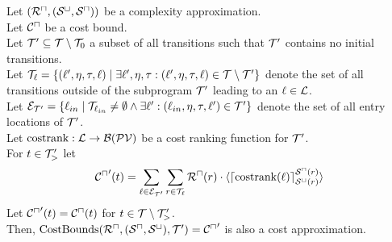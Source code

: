 \begin{theorem}[CostBounds]
  Let $({\mathcal{R}^\sqcap}, {({\mathcal{S}^\sqcup}, {\mathcal{S}^\sqcap})})$ be a complexity approximation. \\
  Let ${\mathcal{C}^\sqcap}$ be a cost bound. \\
  Let $\mathcal{T}' \subseteq \mathcal{T} \setminus \mathcal{T}_0$ a subset of all transitions such that $\mathcal{T}'$ contains no initial transitions. \\
  Let $\mathcal{T}_{\ell} = \lbrace (\ell', \eta, \tau, \ell) \mid \exists \ell', \eta, \tau: (\ell', \eta, \tau, \ell) \in \mathcal{T} \setminus \mathcal{T}' \rbrace$ denote the set of all transitions outside of the subprogram $\mathcal{T}'$ leading to an $\ell \in \mathcal{L}$. \\
  Let $\mathcal{E}_{\mathcal{T}'} = \lbrace \ell_{in} \mid \mathcal{T}_{\ell_{in}} \neq \emptyset \wedge \exists \ell': (\ell_{in}, \eta, \tau, \ell') \in \mathcal{T}' \rbrace$ denote the set of all entry locations of $\mathcal{T}'$. \\
  Let $\text{costrank}: \mathcal{L} \rightarrow \mathcal{B}(\mathcal{PV})$ be a cost ranking function for $\mathcal{T}'$. \\
  For $t \in \mathcal{T}'_>$ let
  \[ {\mathcal{C}^\sqcap}'(t) = \sum_{\ell \in \mathcal{E}_{\mathcal{T}'}} \sum_{r \in \mathcal{T}_\ell} {\mathcal{R}^\sqcap}(r) \cdot \langle\lceil \text{costrank}(\ell) \rceil^{{\mathcal{S}^\sqcap}(r)}_{{\mathcal{S}^\sqcup}(r)}\rangle \]
  Let ${\mathcal{C}^\sqcap}'(t) = {\mathcal{C}^\sqcap}(t)$ for $t \in \mathcal{T} \setminus \mathcal{T}'_>$. \\
  Then, $\text{CostBounds}({\mathcal{R}^\sqcap}, ({\mathcal{S}^\sqcap}, {\mathcal{S}^\sqcup}), \mathcal{T}') = {\mathcal{C}^\sqcap}'$ is also a cost approximation.
\end{theorem}
